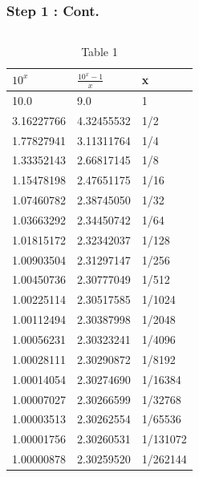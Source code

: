 \documentclass{beamer}
\begin{document}
\begin{frame}
    \frametitle{Step 1 : Cont.}
    \begin{columns}
        \begin{table}[]
            \tiny
            \caption{Table 1}
            \centering
            \def\arraystretch{1.2}
            \begin{tabular}{|l|l|l|} \hline
                $10^x$     & $\frac{10^x-1}{x}$ & x        \\ \hline  \hline
                10.0       & 9.0                & 1        \\ \hline
                3.16227766 & 4.32455532         & 1/2      \\ \hline
                1.77827941 & 3.11311764         & 1/4      \\ \hline
                1.33352143 & 2.66817145         & 1/8      \\ \hline
                1.15478198 & 2.47651175         & 1/16     \\ \hline
                1.07460782 & 2.38745050         & 1/32     \\ \hline
                1.03663292 & 2.34450742         & 1/64     \\ \hline
                1.01815172 & 2.32342037         & 1/128    \\ \hline
                1.00903504 & 2.31297147         & 1/256    \\ \hline
                1.00450736 & 2.30777049         & 1/512    \\ \hline
                1.00225114 & 2.30517585         & 1/1024   \\ \hline
                1.00112494 & 2.30387998         & 1/2048   \\ \hline
                1.00056231 & 2.30323241         & 1/4096   \\ \hline
                1.00028111 & 2.30290872         & 1/8192   \\ \hline
                1.00014054 & 2.30274690         & 1/16384  \\ \hline
                1.00007027 & 2.30266599         & 1/32768  \\ \hline
                1.00003513 & 2.30262554         & 1/65536  \\ \hline
                1.00001756 & 2.30260531         & 1/131072 \\ \hline
                1.00000878 & 2.30259520         & 1/262144 \\ \hline

\end{tabular}
\end{table}
\end{columns}
\end{frame}
\end{document}
